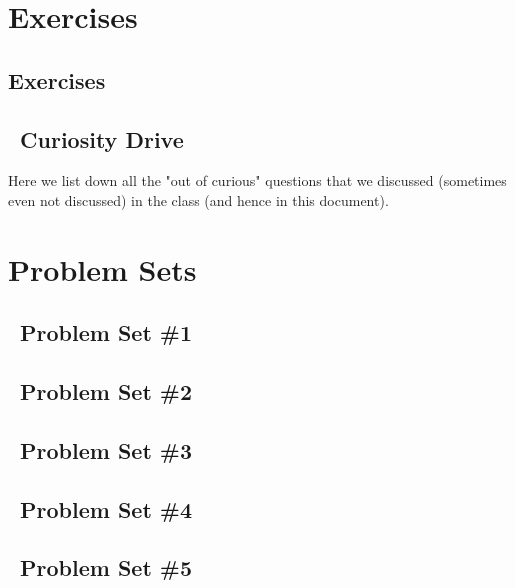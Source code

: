 \documentclass[11pt]{report}
\begin{document}
\chapter{Exercises}
\section{Exercises}
\setcounter{excount}{0}

\newpage

\section{~Curiosity Drive}
Here we list down all the "out of curious" questions that we discussed (sometimes even not discussed) in the class (and hence in this document).

\def\psetbackref{0}

\chapter{Problem Sets}

\section{~Problem Set \#1}
\begin{enumerate}[(1)]
\end{enumerate}

\newpage
\section{~Problem Set \#2}

\begin{enumerate}[(1)]
\end{enumerate}

\newpage
\section{~Problem Set \#3}

\begin{enumerate}[(1)]
\end{enumerate}

\newpage
\section{~Problem Set \#4}

\begin{enumerate}[(1)]
\end{enumerate}


\newpage
\section{~Problem Set \#5}

\begin{enumerate}[(1)]
\end{enumerate}



\end{document}
